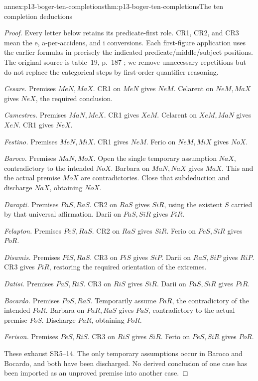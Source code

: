 \begin{annexitem}{annex:p13-boger-ten-completions}{thm:p13-boger-ten-completions}{The ten completion deductions}
\begin{proof}
Every letter below retains its predicate-first role. CR1, CR2, and CR3 mean
the e, a-per-accidens, and i conversions. Each first-figure application uses
the earlier formulas in precisely the indicated predicate/middle/subject
positions. The original source is table~19, p.~187
\parencite{Boger2004UnderlyingLogic}; we remove unnecessary repetitions but
do not replace the categorical steps by first-order quantifier reasoning.

\emph{Cesare.} Premises \(MeN,MaX\). CR1 on \(MeN\) gives \(NeM\).
Celarent on \(NeM,MaX\) gives \(NeX\), the required conclusion.

\emph{Camestres.} Premises \(MaN,MeX\). CR1 gives \(XeM\).
Celarent on \(XeM,MaN\) gives \(XeN\). CR1 gives \(NeX\).

\emph{Festino.} Premises \(MeN,MiX\). CR1 gives \(NeM\).
Ferio on \(NeM,MiX\) gives \(NoX\).

\emph{Baroco.} Premises \(MaN,MoX\). Open the single temporary assumption
\(NaX\), contradictory to the intended \(NoX\). Barbara on \(MaN,NaX\)
gives \(MaX\). This and the actual premise \(MoX\) are contradictories.
Close that subdeduction and discharge \(NaX\), obtaining \(NoX\).

\emph{Darapti.} Premises \(PaS,RaS\). CR2 on \(RaS\) gives \(SiR\),
using the existent \(S\) carried by that universal affirmation.
Darii on \(PaS,SiR\) gives \(PiR\).

\emph{Felapton.} Premises \(PeS,RaS\). CR2 on \(RaS\) gives \(SiR\).
Ferio on \(PeS,SiR\) gives \(PoR\).

\emph{Disamis.} Premises \(PiS,RaS\). CR3 on \(PiS\) gives \(SiP\).
Darii on \(RaS,SiP\) gives \(RiP\). CR3 gives \(PiR\), restoring
the required orientation of the extremes.

\emph{Datisi.} Premises \(PaS,RiS\). CR3 on \(RiS\) gives \(SiR\).
Darii on \(PaS,SiR\) gives \(PiR\).

\emph{Bocardo.} Premises \(PoS,RaS\). Temporarily assume \(PaR\),
the contradictory of the intended \(PoR\). Barbara on \(PaR,RaS\)
gives \(PaS\), contradictory to the actual premise \(PoS\).
Discharge \(PaR\), obtaining \(PoR\).

\emph{Ferison.} Premises \(PeS,RiS\). CR3 on \(RiS\) gives \(SiR\).
Ferio on \(PeS,SiR\) gives \(PoR\).

These exhaust SR5--14. The only temporary assumptions occur in Baroco
and Bocardo, and both have been discharged. No derived conclusion of one
case has been imported as an unproved premise into another case.
\end{proof}
\end{annexitem}

